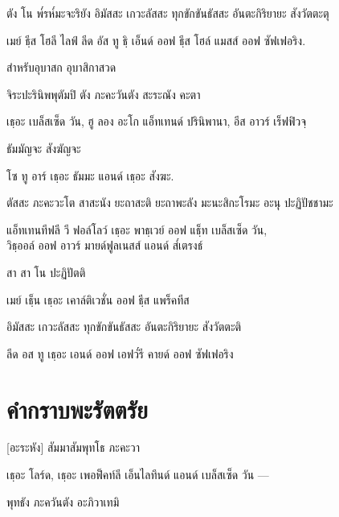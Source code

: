 ตัง โน พ๎รห๎มะจะริยัง อิมัสสะ เกวะลัสสะ ทุกขักขันธัสสะ อันตะกิริยายะ สังวัตตะตุ

\begin{english}
เมย์ ธฺีส โฮลี ไลฟ์ ลีด อัส ทู ธฺิ เอ็นด์ ออฟ ธฺีส โฮล์ แมสส์ ออฟ ซัฟเฟอริง.
\end{english}

\begin{instruction}
สำหรับอุบาสก อุบาสิกาสวด
\end{instruction}

จิระปะรินิพพุตัมปิ ตัง ภะคะวันตัง สะระณัง คะตา

\begin{english}
เธฺอะ เบล็สเซ็ด  วัน, ฮู ลอง อะโก แอ็ทเทนด์ ปรินิพานา, อีส อาวร์ เร็ฟฟิวจฺ
\end{english}

ธัมมัญจะ สังฆัญจะ

\begin{english}
โซ ทู อาร์ เธฺอะ ธัมมะ แอนด์ เธฺอะ สังฆะ.
\end{english}

 ตัสสะ ภะคะวะโต สาสะนัง ยะถาสะติ ยะถาพะลัง มะนะสิกะโรมะ อะนุ ปะฏิปัชชามะ

\begin{english}
แอ็ทเทนทีฟลี วี ฟอล์โลว์ เธฺอะ พาธฺเวย์ ออฟ แธ็ฺท เบล็สเซ็ด วัน,\\
วิธฺออล์ ออฟ อาวร์ มายด์ฟูลเนสส์ แอนด์ ส๎เตรงธ์
\end{english}

สา สา โน ปะฏิปัตติ

\begin{english}
เมย์ เธ็ฺน เธฺอะ เคาล์ติเวชั่น ออฟ ธีฺส แพร็คทีส
\end{english}

อิมัสสะ เกวะลัสสะ ทุกขักขันธัสสะ อันตะกิริยายะ สังวัตตะติ

\begin{english}
ลีด อส ทู เธฺอะ เอนด์ ออฟ เอฟว๎รี คายด์ ออฟ ซัฟเฟอริง
\end{english}

\chapter{คำกราบพะรัตตรัย}

[อะระหัง] สัมมาสัมพุทโธ ภะคะวา

\begin{english}
เธฺอะ โลร์ด, เธฺอะ เพอฟ็คท์ลี เอ็นไลทึนด์ แอนด์ เบล็สเซ็ด วัน —
\end{english}

พุทธัง ภะควันตัง อะภิวาเทมิ


